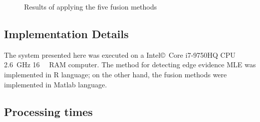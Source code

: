 \documentclass[journal]{IEEEtran}
\begin{document}
\begin{figure}[hbt]
{     }
     \caption{Results of applying the five fusion methods}
     \label{fusion_met}
\end{figure}

\subsection{Implementation Details}
The system presented here was executed on a Intel\copyright\ Core i7-9750HQ CPU \SI{2.6}{\giga\hertz} \SI{16}{\giga\byte} RAM computer.  
The method for detecting edge evidence MLE was implemented in R language; on the other hand, the fusion methods were implemented in Matlab language. 

\subsection{Processing times} 
\end{document}
